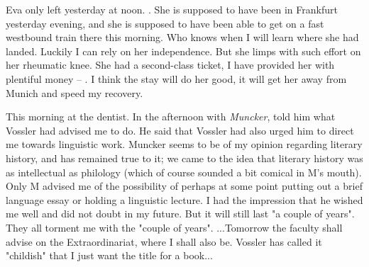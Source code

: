 
\missing

Eva only left yesterday at noon. \missing. She is supposed to have been in Frankfurt yesterday evening, and she is supposed to have been able to get on a fast westbound train there this morning. Who knows when I will learn where she had landed. Luckily I can rely on her independence. But she limps with such effort on her rheumatic knee. She had a second-class ticket, I have provided her with plentiful money -- . I think the stay will do her good, it will get her away from Munich and speed my recovery. \missing

This morning at the dentist. In the afternoon with \textit{Muncker}, told him what Vossler had advised me to do. He said that Vossler had also urged him to direct me towards linguistic work. Muncker seems to be of my opinion regarding literary history, and has remained true to it; we came to the idea that literary history was as intellectual as philology (which of course sounded a bit comical in M's mouth). Only M advised me of the possibility of perhaps at some point putting out a brief language essay or holding a linguistic lecture. I had the impression that he wished me well and did not doubt in my future. But it will still last "a couple of years". They all torment me with the "couple of years". ...Tomorrow the faculty shall advise on the Extraordinariat, where I shall also be. Vossler has called it "childish" that I just want the title for a book...\missing